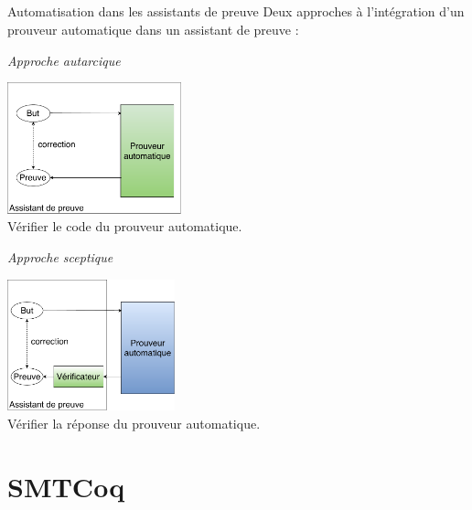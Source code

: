 \documentclass{beamer}
\begin{document}
    \subsection{}
    \begin{frame}{Automatisation dans les assistants de preuve}
      Deux approches à l'intégration d'un prouveur automatique dans un assistant de preuve :
      \begin{multicols}{2}
        \begin{center}
          \textit{Approche autarcique}
        \end{center}
        \includegraphics[height=3.8cm]{autarcique.pdf}\\
        Vérifier le code du prouveur automatique. \\
        \begin{center}
          \textit{Approche sceptique}
        \end{center}
        \includegraphics[height=3.8cm]{sceptique.pdf}\\
        Vérifier la réponse du prouveur automatique.
      \end{multicols}
    \end{frame}



    \section{SMTCoq}
\end{document}
